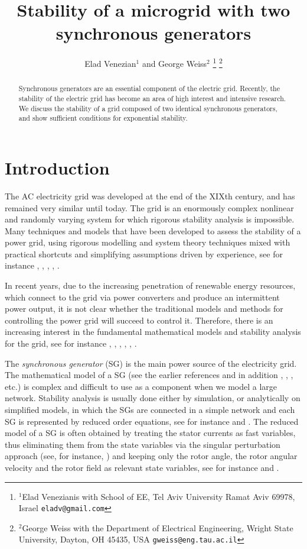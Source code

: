 \documentclass[letterpaper, 10 pt, conference]{ieeeconf}  %
\title{\LARGE \bf
Stability of a microgrid with two synchronous generators 
}
\author{Elad Venezian$^{1}$ and George Weiss$^{2}$%
\thanks{$^{1}$Elad Venezianis with School of EE,
        Tel Aviv University Ramat Aviv 69978, Israel
        {\tt\small eladv@gmail.com}}%
\thanks{$^{2}$George Weiss with the Department of Electrical Engineering, Wright State University,
        Dayton, OH 45435, USA
        {\tt\small gweiss@eng.tau.ac.il}}%
}
\begin{document}
\maketitle
\thispagestyle{empty}
\pagestyle{empty}


\begin{abstract}

Synchronous generators are an essential component of the electric
grid. Recently, the stability of the electric grid has become an area
of high interest and intensive research. We discuss the stability of a
grid composed of two identical synchronous generators, and show sufficient conditions for exponential stability.

\end{abstract}


\section{Introduction}

The AC electricity grid was developed at the end of the XIXth century,
and has remained very similar until today. The grid is an enormously
complex nonlinear and randomly varying system for which rigorous
stability analysis is impossible. Many techniques and models that have
been developed to assess the stability of a power grid, using rigorous
modelling and system theory techniques mixed with practical shortcuts
and simplifying assumptions driven by experience, see for instance
\cite{Kundur}, \cite{GrSt2014}, \cite{SauerPai1998}, \cite{GOBS:03},
\cite{DoBull:12}.

In recent years, due to the increasing penetration of renewable energy
resources, which connect to the grid via power converters and produce
an intermittent power output, it is not clear whether the traditional
models and methods for controlling the power grid will succeed to
control it. Therefore, there is an increasing interest in the
fundamental mathematical models and stability analysis for the grid,
see for instance \cite{DoBull:12}, \cite{PoDoBu:13}, \cite{CaTa:14},
\cite{NaWe:14}, \cite{NaWe:15}, \cite{DePersiSchaft:16}.

The {\em synchronous generator} (SG) is the main power source of the
electricity grid. The mathematical model of a SG (see the earlier
references and in addition \cite{Walker:94}, \cite{Fitzgerald:03},
\cite{MaWe:15}, etc.) is complex and difficult to use as a component
when we model a large network. Stability analysis is usually done
either by simulation, or analytically on simplified models, in which
the SGs are connected in a simple network and each SG is represented
by reduced order equations, see for instance \cite{DoBull:12} and
\cite{PoDoBu:13}. The reduced model of a SG is often obtained by
treating the stator currents as fast variables, thus eliminating them
from the state variables via the singular perturbation approach (see,
for instance, \cite{Khalil}) and keeping only the rotor angle, the
rotor angular velocity and the rotor field as relevant state
variables, see for instance \cite{Kundur} and \cite{SauerPai1998}.
\end{document}
